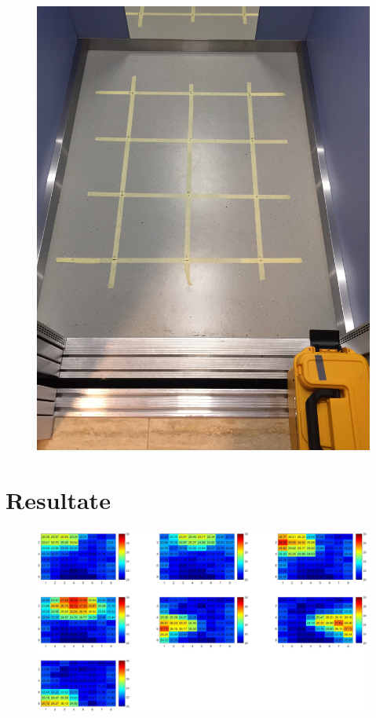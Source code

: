 \begin{figure}[H]
	\centering
	\includegraphics[width=1.0\textwidth, angle=270]{fig/Messraster.JPG}
	\caption{}
	\label{fig:p1gallpositionsmean}
\end{figure}






\section{Resultate}

\begin{figure}
	\centering
	\includegraphics[width=1.0\textwidth]{fig/p1_g_Allpositions_mean}
	\caption{}
	\label{fig:p1gallpositionsmean}
\end{figure}





